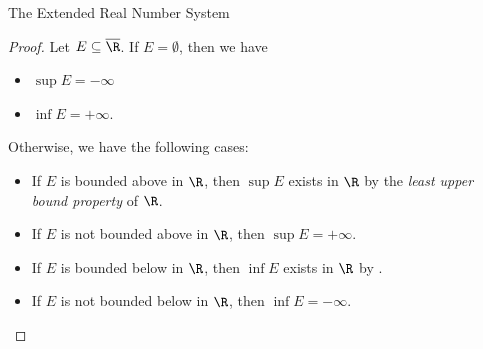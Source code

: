 \begin{section}{The Extended Real Number System}
\begin{proof}
    Let $E \subseteq \overline{\R}$. If $E = \emptyset$, then we have
    \begin{itemize}
        \item $\sup E = - \infty$
        \item $\inf E = + \infty$.
    \end{itemize}
    Otherwise, we have the following cases:
    \begin{itemize}
        \item If $E$ is bounded above in $\R$, then $\sup E$ exists in $\R$ by the
        \emph{least upper bound property} of $\R$.
        \item If $E$ is not bounded above in $\R$, then $\sup E = + \infty$.
        \item If $E$ is bounded below in $\R$, then $\inf E$ exists in $\R$ by .
        \item If $E$ is not bounded below in $\R$, then $\inf E = - \infty$.
    \end{itemize}
\end{proof}

\end{section}